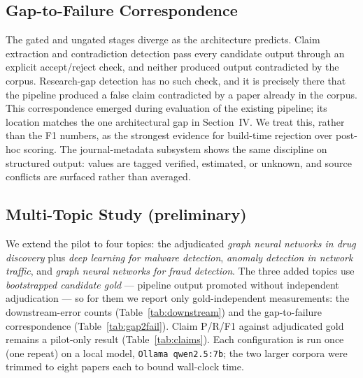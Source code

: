 \documentclass[conference]{IEEEtran}
\newcommand{\NumTopics}{four}
\begin{document}
\subsection{Gap-to-Failure Correspondence}
The gated and ungated stages diverge as the architecture predicts. Claim
extraction and contradiction detection pass every candidate output through an
explicit accept/reject check, and neither produced output contradicted by the
corpus. Research-gap detection has no such check, and it is precisely there that
the pipeline produced a false claim contradicted by a paper already in the
corpus. This correspondence emerged during evaluation of the existing pipeline;
its location matches the one architectural gap in Section~IV. We treat this,
rather than the F1 numbers, as the strongest evidence for build-time rejection
over post-hoc scoring. The journal-metadata subsystem shows the same discipline
on structured output: values are tagged verified, estimated, or unknown, and
source conflicts are surfaced rather than averaged.

\subsection{Multi-Topic Study (preliminary)}
\label{sec:multitopic}
We extend the pilot to \NumTopics{} topics: the adjudicated \emph{graph neural
networks in drug discovery} plus \emph{deep learning for malware detection},
\emph{anomaly detection in network traffic}, and \emph{graph neural networks
for fraud detection}. The three added topics use \emph{bootstrapped candidate
gold} --- pipeline output promoted without independent adjudication --- so for
them we report only gold-independent measurements: the downstream-error counts
(Table~\ref{tab:downstream}) and the gap-to-failure correspondence
(Table~\ref{tab:gap2fail}). Claim P/R/F1 against adjudicated gold remains a
pilot-only result (Table~\ref{tab:claims}). Each configuration is run once
(one repeat) on a local model, \texttt{Ollama qwen2.5:7b}; the two larger
corpora were trimmed to eight papers each to bound wall-clock time.
\end{document}

